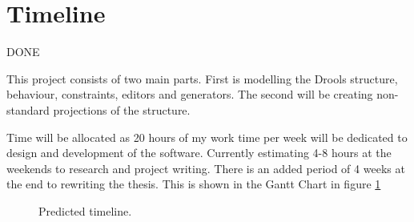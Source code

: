 \section{Timeline}
{\LARGE DONE}

This project consists of two main parts.
First is modelling the Drools structure, behaviour, constraints, editors and generators.
The second will be creating non-standard projections of the structure.

Time will be allocated as 20 hours of my work time per week will be dedicated to design and development of the software.
Currently estimating 4-8 hours at the weekends to research and project writing.
There is an added period of 4 weeks at the end to rewriting the thesis.
This is shown in the Gantt Chart in figure \ref{fig:ganttchart}

\begin{figure}[H]
    \centering
    \caption{Predicted timeline.}
    \label{fig:ganttchart}
\end{figure}
